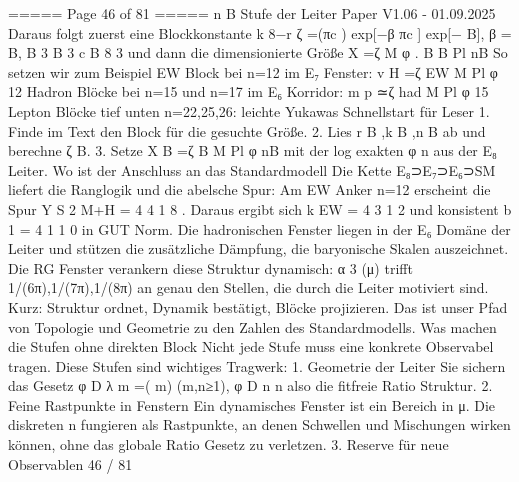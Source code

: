 \begin{MyVerbatim}
{===== Page 46 of 81 =====
n B Stufe der Leiter
Paper V1.06 - 01.09.2025
Daraus folgt zuerst eine Blockkonstante
k 8−r
ζ =(πc ) exp[−β πc ] exp[− B], β = B,
B 3 B 3 c B 8
3
und dann die dimensionierte Größe
X =ζ M φ .
B B Pl nB
So setzen wir zum Beispiel
EW Block bei n=12 im E₇ Fenster: v H =ζ EW M Pl φ 12
Hadron Blöcke bei n=15 und n=17 im E₆ Korridor: m p ≃ζ had M Pl φ 15
Lepton Blöcke tief unten n=22,25,26: leichte Yukawas
Schnellstart für Leser
1. Finde im Text den Block für die gesuchte Größe.
2. Lies r B ,k B ,n B ab und berechne ζ B.
3. Setze X B =ζ B M Pl φ nB mit der log exakten φ n aus der E₈ Leiter.
Wo ist der Anschluss an das Standardmodell
Die Kette E₈⊃E₇⊃E₆⊃SM liefert die Ranglogik und die abelsche Spur:
Am EW Anker n=12 erscheint die Spur Y S 2 M+H = 4 4 1 8 . Daraus ergibt sich k EW = 4 3 1 2 und konsistent b 1 = 4 1 1 0 in GUT
Norm.
Die hadronischen Fenster liegen in der E₆ Domäne der Leiter und stützen die zusätzliche Dämpfung, die
baryonische Skalen auszeichnet.
Die RG Fenster verankern diese Struktur dynamisch: α 3 (μ) trifft 1/(6π),1/(7π),1/(8π) an genau den Stellen, die
durch die Leiter motiviert sind.
Kurz: Struktur ordnet, Dynamik bestätigt, Blöcke projizieren. Das ist unser Pfad von Topologie und Geometrie zu den
Zahlen des Standardmodells.
Was machen die Stufen ohne direkten Block
Nicht jede Stufe muss eine konkrete Observabel tragen. Diese Stufen sind wichtiges Tragwerk:
1. Geometrie der Leiter
Sie sichern das Gesetz
φ D λ
m =( m) (m,n≥1),
φ D
n n
also die fitfreie Ratio Struktur.
2. Feine Rastpunkte in Fenstern
Ein dynamisches Fenster ist ein Bereich in μ. Die diskreten n fungieren als Rastpunkte, an denen Schwellen und
Mischungen wirken können, ohne das globale Ratio Gesetz zu verletzen.
3. Reserve für neue Observablen 46 / 81

}
\end{MyVerbatim}
